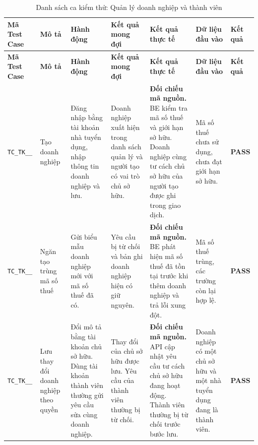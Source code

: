 \begin{landscape}
{
\fontsize{9.5}{11.5}\selectfont
\setlength{\tabcolsep}{3pt}
\renewcommand{\arraystretch}{1.2}
\begin{longtable}{|>{\raggedright\arraybackslash}p{2.1cm}|>{\raggedright\arraybackslash}p{2.8cm}|>{\raggedright\arraybackslash}p{3.8cm}|>{\raggedright\arraybackslash}p{4.0cm}|>{\raggedright\arraybackslash}p{5.0cm}|>{\raggedright\arraybackslash}p{3.2cm}|>{\centering\arraybackslash}p{1.3cm}|}
    \caption{Danh sách ca kiểm thử: Quản lý doanh nghiệp và thành viên} \label{tab:ts-tk-04} \\
    \hline
    \textbf{Mã Test Case} & \textbf{Mô tả} & \textbf{Hành động} & \textbf{Kết quả mong đợi} & \textbf{Kết quả thực tế} & \textbf{Dữ liệu đầu vào} & \textbf{Kết quả} \\
    \hline
    \endfirsthead
    \hline
    \textbf{Mã Test Case} & \textbf{Mô tả} & \textbf{Hành động} & \textbf{Kết quả mong đợi} & \textbf{Kết quả thực tế} & \textbf{Dữ liệu đầu vào} & \textbf{Kết quả} \\
    \hline
    \endhead
    \hline
    \endfoot
    \hline
    \endlastfoot
    \texttt{TC\_\allowbreak TK\_\allowbreak 04\_\allowbreak 01} & Tạo doanh nghiệp & Đăng nhập bằng tài khoản nhà tuyển dụng, nhập thông tin doanh nghiệp và lưu. & Doanh nghiệp xuất hiện trong danh sách quản lý và người tạo có vai trò chủ sở hữu. & \textbf{Đối chiếu mã nguồn.} BE kiểm tra mã số thuế và giới hạn sở hữu. Doanh nghiệp cùng tư cách chủ sở hữu của người tạo được ghi trong giao dịch. & Mã số thuế chưa sử dụng, chưa đạt giới hạn sở hữu. & \textbf{PASS} \\
    \hline
    \texttt{TC\_\allowbreak TK\_\allowbreak 04\_\allowbreak 02} & Ngăn tạo trùng mã số thuế & Gửi biểu mẫu doanh nghiệp mới với mã số thuế đã có. & Yêu cầu bị từ chối và bản ghi doanh nghiệp hiện có giữ nguyên. & \textbf{Đối chiếu mã nguồn.} BE phát hiện mã số thuế đã tồn tại trước khi thêm doanh nghiệp và trả lỗi xung đột. & Mã số thuế trùng, các trường còn lại hợp lệ. & \textbf{PASS} \\
    \hline
    \texttt{TC\_\allowbreak TK\_\allowbreak 04\_\allowbreak 03} & Lưu thay đổi doanh nghiệp theo quyền & Đổi mô tả bằng tài khoản chủ sở hữu. Dùng tài khoản thành viên thường gửi yêu cầu sửa cùng doanh nghiệp. & Thay đổi của chủ sở hữu được lưu. Yêu cầu của thành viên thường bị từ chối. & \textbf{Đối chiếu mã nguồn.} API cập nhật yêu cầu tư cách chủ sở hữu đang hoạt động. Thành viên thường bị từ chối trước bước lưu. & Doanh nghiệp có một chủ sở hữu và một nhà tuyển dụng đang là thành viên. & \textbf{PASS} \\

\end{longtable}}
\end{landscape}
